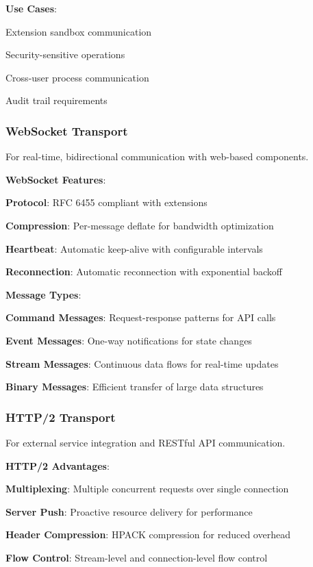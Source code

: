 \textbf{Use Cases}:
\begin{compactlist}
    \item Extension sandbox communication
    \item Security-sensitive operations
    \item Cross-user process communication
    \item Audit trail requirements
\end{compactlist}

\subsubsection*{WebSocket Transport}

For real-time, bidirectional communication with web-based components.

\textbf{WebSocket Features}:
\begin{compactlist}
    \item \textbf{Protocol}: RFC 6455 compliant with extensions
    \item \textbf{Compression}: Per-message deflate for bandwidth optimization
    \item \textbf{Heartbeat}: Automatic keep-alive with configurable intervals
    \item \textbf{Reconnection}: Automatic reconnection with exponential backoff
\end{compactlist}

\textbf{Message Types}:
\begin{compactlist}
    \item \textbf{Command Messages}: Request-response patterns for API calls
    \item \textbf{Event Messages}: One-way notifications for state changes
    \item \textbf{Stream Messages}: Continuous data flows for real-time updates
    \item \textbf{Binary Messages}: Efficient transfer of large data structures
\end{compactlist}

\subsubsection*{HTTP/2 Transport}

For external service integration and RESTful API communication.

\textbf{HTTP/2 Advantages}:
\begin{compactlist}
    \item \textbf{Multiplexing}: Multiple concurrent requests over single connection
    \item \textbf{Server Push}: Proactive resource delivery for performance
    \item \textbf{Header Compression}: HPACK compression for reduced overhead
    \item \textbf{Flow Control}: Stream-level and connection-level flow control
\end{compactlist}

